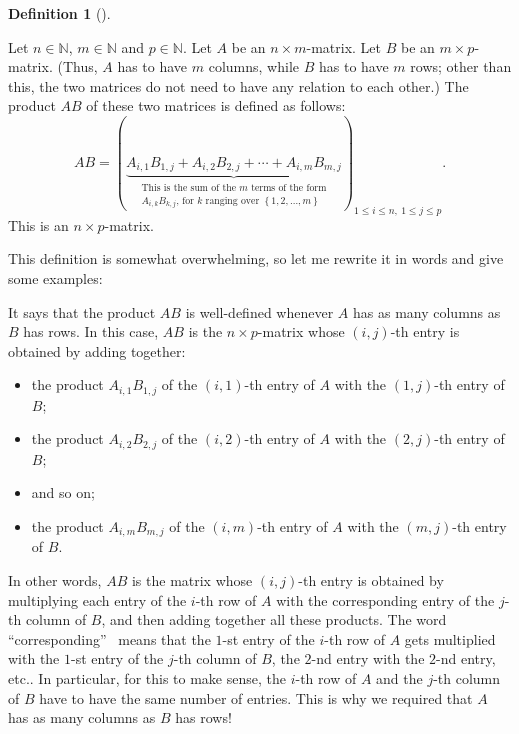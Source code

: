 \documentclass[numbers=enddot,12pt,final,onecolumn,notitlepage]{scrartcl}%
\theoremstyle{definition}
\newtheorem{defi}[theo]{Definition}
\newenvironment{definition}[1][]
{\begin{defi}[#1]\begin{leftbar}}
{\end{leftbar}\end{defi}}
\begin{document}
\begin{definition}
\label{def.AB}Let $n\in\mathbb{N}$, $m\in\mathbb{N}$ and $p\in\mathbb{N}$. Let
$A$ be an $n\times m$-matrix. Let $B$ be an $m\times p$-matrix. (Thus, $A$ has
to have $m$ columns, while $B$ has to have $m$ rows; other than this, the two
matrices do not need to have any relation to each other.) The product $AB$ of
these two matrices is defined as follows:%
\[
AB=\left(  \underbrace{A_{i,1}B_{1,j}+A_{i,2}B_{2,j}+\cdots+A_{i,m}B_{m,j}%
}_{\substack{\text{This is the sum of the }m\text{ terms of the form}%
\\A_{i,k}B_{k,j}\text{, for }k\text{ ranging over }\left\{  1,2,\ldots
,m\right\}  }}\right)  _{1\leq i\leq n,\ 1\leq j\leq p}.
\]
This is an $n\times p$-matrix.
\end{definition}

This definition is somewhat overwhelming, so let me rewrite it in words and
give some examples:

It says that the product $AB$ is well-defined whenever $A$ has as many columns
as $B$ has rows. In this case, $AB$ is the $n\times p$-matrix whose $\left(
i,j\right)  $-th entry is obtained by adding together:

\begin{itemize}
\item the product $A_{i,1}B_{1,j}$ of the $\left(  i,1\right)  $-th entry of
$A$ with the $\left(  1,j\right)  $-th entry of $B$;

\item the product $A_{i,2}B_{2,j}$ of the $\left(  i,2\right)  $-th entry of
$A$ with the $\left(  2,j\right)  $-th entry of $B$;

\item and so on;

\item the product $A_{i,m}B_{m,j}$ of the $\left(  i,m\right)  $-th entry of
$A$ with the $\left(  m,j\right)  $-th entry of $B$.
\end{itemize}

In other words, $AB$ is the matrix whose $\left(  i,j\right)  $-th entry is
obtained by multiplying each entry of the $i$-th row of $A$ with the
corresponding entry of the $j$-th column of $B$, and then adding together all
these products. The word \textquotedblleft corresponding\textquotedblright%
\ means that the $1$-st entry of the $i$-th row of $A$ gets multiplied with
the $1$-st entry of the $j$-th column of $B$, the $2$-nd entry with the $2$-nd
entry, etc.. In particular, for this to make sense, the $i$-th row of $A$ and
the $j$-th column of $B$ have to have the same number of entries. This is why
we required that $A$ has as many columns as $B$ has rows!
\end{document}
